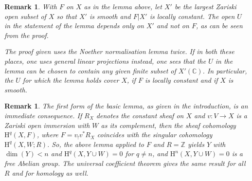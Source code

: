 \documentclass[10pt,twoside]{article}
\newcommand{\Z}{{\mathbb {Z}}}
\newcommand{\homology}{{\mathrm {H}}}
\newcommand{\C}{{\mathbb {C}}}
\newtheorem{remark}[thm]{Remark}
\begin{document}
\begin{remark}
With $F$ on $X$ as in the lemma above, let $X'$ be
the largest Zariski open subset of $X$ so that $X'$ is smooth
and $F|X'$ is locally constant. The open $U$ in the statement
of the lemma \emph{depends only on} $X'$ \emph{and not on} $F$,
as can be seen from the proof.
 
The proof given uses the Noether normalisation lemma twice. If
in both these places, one uses general linear projections instead, one
sees that the $U$ in the lemma can be chosen
to contain any given finite subset of $X'(\C)$. In particular,
\emph{the $U$ for which the lemma holds cover $X$, if $F$ is locally
constant and if $X$ is smooth}. 
\end{remark}

\begin{remark}
The first form of the basic lemma, 
as given in the introduction,
is an immediate consequence. If $R_X$ denotes the constant sheaf
on $X$ and $v: V\to X$ is a Zariski open immersion with $W$
as its complement, then the sheaf cohomology
$\homology ^q(X,F)$, where $F=v_!v^*R_X$  
coincides with the singular cohomology
$\homology ^q(X,W;R)$. So, the above lemma applied to $F$ 
and $R=\Z$ yields
$Y$ with $\dim (Y)<n$ and $\homology ^q(X,Y\cup W)=0$
 for $q\neq n$, and   $\homology ^n(X,Y\cup W)=0$ 
is a free Abelian group. The universal
coefficient theorem gives the same result for all $R$ and
for homology as well.
\end{remark}
\end{document}

